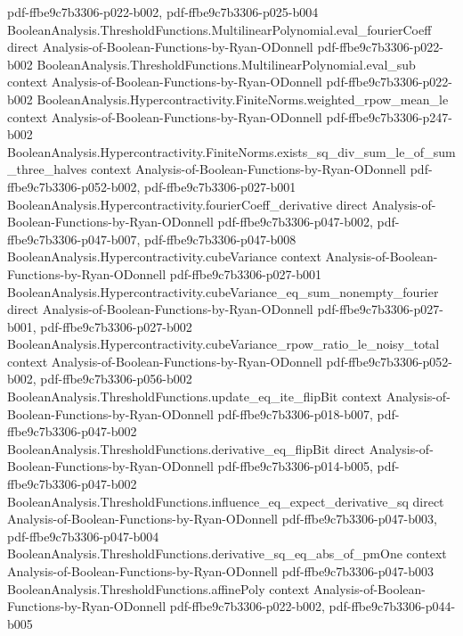 \begin{theorem}
  {pdf-ffbe9c7b3306-p022-b002,
    pdf-ffbe9c7b3306-p025-b004}
\proofstep
  {BooleanAnalysis.ThresholdFunctions.MultilinearPolynomial.eval_fourierCoeff}
  {direct}
  {Analysis-of-Boolean-Functions-by-Ryan-ODonnell}
  {pdf-ffbe9c7b3306-p022-b002}
\proofstep
  {BooleanAnalysis.ThresholdFunctions.MultilinearPolynomial.eval_sub}
  {context}
  {Analysis-of-Boolean-Functions-by-Ryan-ODonnell}
  {pdf-ffbe9c7b3306-p022-b002}
\proofstep
  {BooleanAnalysis.Hypercontractivity.FiniteNorms.weighted_rpow_mean_le}
  {context}
  {Analysis-of-Boolean-Functions-by-Ryan-ODonnell}
  {pdf-ffbe9c7b3306-p247-b002}
\proofstep
  {BooleanAnalysis.Hypercontractivity.FiniteNorms.exists_sq_div_sum_le_of_sum_three_halves}
  {context}
  {Analysis-of-Boolean-Functions-by-Ryan-ODonnell}
  {pdf-ffbe9c7b3306-p052-b002,
    pdf-ffbe9c7b3306-p027-b001}
\proofstep
  {BooleanAnalysis.Hypercontractivity.fourierCoeff_derivative}
  {direct}
  {Analysis-of-Boolean-Functions-by-Ryan-ODonnell}
  {pdf-ffbe9c7b3306-p047-b002,
    pdf-ffbe9c7b3306-p047-b007,
    pdf-ffbe9c7b3306-p047-b008}
\proofstep
  {BooleanAnalysis.Hypercontractivity.cubeVariance}
  {context}
  {Analysis-of-Boolean-Functions-by-Ryan-ODonnell}
  {pdf-ffbe9c7b3306-p027-b001}
\proofstep
  {BooleanAnalysis.Hypercontractivity.cubeVariance_eq_sum_nonempty_fourier}
  {direct}
  {Analysis-of-Boolean-Functions-by-Ryan-ODonnell}
  {pdf-ffbe9c7b3306-p027-b001,
    pdf-ffbe9c7b3306-p027-b002}
\proofstep
  {BooleanAnalysis.Hypercontractivity.cubeVariance_rpow_ratio_le_noisy_total}
  {context}
  {Analysis-of-Boolean-Functions-by-Ryan-ODonnell}
  {pdf-ffbe9c7b3306-p052-b002,
    pdf-ffbe9c7b3306-p056-b002}
\proofstep
  {BooleanAnalysis.ThresholdFunctions.update_eq_ite_flipBit}
  {context}
  {Analysis-of-Boolean-Functions-by-Ryan-ODonnell}
  {pdf-ffbe9c7b3306-p018-b007,
    pdf-ffbe9c7b3306-p047-b002}
\proofstep
  {BooleanAnalysis.ThresholdFunctions.derivative_eq_flipBit}
  {direct}
  {Analysis-of-Boolean-Functions-by-Ryan-ODonnell}
  {pdf-ffbe9c7b3306-p014-b005,
    pdf-ffbe9c7b3306-p047-b002}
\proofstep
  {BooleanAnalysis.ThresholdFunctions.influence_eq_expect_derivative_sq}
  {direct}
  {Analysis-of-Boolean-Functions-by-Ryan-ODonnell}
  {pdf-ffbe9c7b3306-p047-b003,
    pdf-ffbe9c7b3306-p047-b004}
\proofstep
  {BooleanAnalysis.ThresholdFunctions.derivative_sq_eq_abs_of_pmOne}
  {context}
  {Analysis-of-Boolean-Functions-by-Ryan-ODonnell}
  {pdf-ffbe9c7b3306-p047-b003}
\proofstep
  {BooleanAnalysis.ThresholdFunctions.affinePoly}
  {context}
  {Analysis-of-Boolean-Functions-by-Ryan-ODonnell}
  {pdf-ffbe9c7b3306-p022-b002,
    pdf-ffbe9c7b3306-p044-b005}

\end{theorem}
